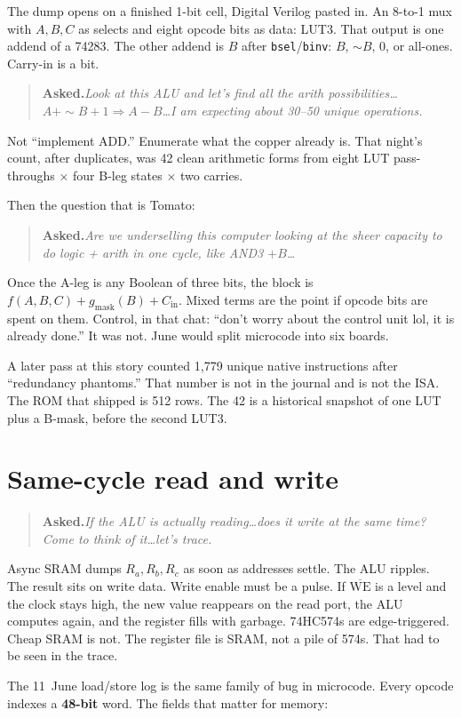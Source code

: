 \documentclass[11pt,openany]{book}
\newcommand{\asked}[1]{%
  \begin{quote}
  \noindent\textbf{Asked.}\quad\textit{#1}
  \end{quote}
}
\begin{document}
The dump opens on a finished 1-bit cell, Digital Verilog pasted in. An 8-to-1 mux with $A,B,C$ as selects and eight opcode bits as data: LUT3. That output is one addend of a 74283. The other addend is $B$ after \texttt{bsel}/\texttt{binv}: $B$, $\sim B$, $0$, or all-ones. Carry-in is a bit.

\asked{Look at this ALU and let's find all the arith possibilities\ldots $A+\sim B+1 \Rightarrow A-B$\ldots I am expecting about 30--50 unique operations.}

Not ``implement ADD.'' Enumerate what the copper already is. That night's count, after duplicates, was 42 clean arithmetic forms from eight LUT pass-throughs $\times$ four B-leg states $\times$ two carries.

Then the question that is Tomato:

\asked{Are we underselling this computer looking at the sheer capacity to do logic + arith in one cycle, like AND3 $+ B$\ldots}

Once the A-leg is any Boolean of three bits, the block is $f(A,B,C)+g_{\mathrm{mask}}(B)+C_{\mathrm{in}}$. Mixed terms are the point if opcode bits are spent on them. Control, in that chat: ``don't worry about the control unit lol, it is already done.'' It was not. June would split microcode into six boards.

A later pass at this story counted 1{,}779 unique native instructions after ``redundancy phantoms.'' That number is not in the journal and is not the ISA. The ROM that shipped is 512 rows. The 42 is a historical snapshot of one LUT plus a B-mask, before the second LUT3.

\chapter{Same-cycle read and write}

\asked{If the ALU is actually reading\ldots does it write at the same time? Come to think of it\ldots let's trace.}

Async SRAM dumps $R_a,R_b,R_c$ as soon as addresses settle. The ALU ripples. The result sits on write data. Write enable must be a pulse. If $\overline{\mathrm{WE}}$ is a level and the clock stays high, the new value reappears on the read port, the ALU computes again, and the register fills with garbage. 74HC574s are edge-triggered. Cheap SRAM is not. The register file is SRAM, not a pile of 574s. That had to be seen in the trace.

The 11~June load/store log is the same family of bug in microcode. Every opcode indexes a \textbf{48-bit} word. The fields that matter for memory:
\end{document}
